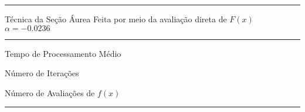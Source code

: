         \begin{minipage}[h!]{\linewidth}            
            \centering
            \hrule
            \vspace{2mm}
            Técnica da Seção Áurea Feita por meio da avaliação direta de $F(x)$ \\ $\alpha=-0.0236$
            \vspace{2mm}
            \noindent
            \hrule 
            \vspace{2mm}
            Tempo de Processamento Médio\\
            \label{tab:tblAa} 
            \writetablestt{\tblAa}\par
            \bigskip
            \centering
            Número de Iterações\\
            \label{tab:tblAb} 
            \writetablestt{\tblAb}\par
            \bigskip
            \centering
            Número de Avaliações de $f(x)$\\
            \label{tab:tblAc} 
            \writetablestt{\tblAc}\par
            \vspace{2mm}
            \hrule
            \vspace{2mm}
        \end{minipage}

        \pgfplotsset{width=7cm,compat=1.18}

 
  
